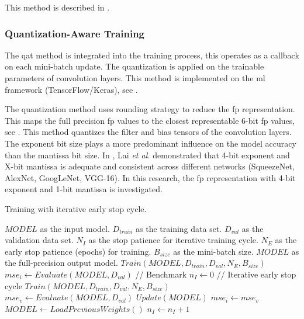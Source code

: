 This method is described in .

\subsubsection{Quantization-Aware Training}
The \gls{qat} method is integrated into the training process, this operates as a callback on each mini-batch update. The quantization is applied on the trainable parameters of convolution layers. This method is implemented on the \gls{ml} framework (TensorFlow/Keras), see .

The quantization method uses rounding strategy to reduce the \gls{fp} representation. This maps the full precision \gls{fp} values to the closest representable 6-bit \gls{fp} values, see . This method quantizes the filter and bias tensors of the convolution layers. The exponent bit size plays a more predominant influence on the model accuracy than the mantissa bit size. In \cite{lai2017deep}, Lai \textit{et al.} demonstrated that 4-bit exponent and X-bit mantissa is adequate and consistent across different networks (SqueezeNet, AlexNet, GoogLeNet, VGG-16). In this research, the \gls{fp} representation with 4-bit exponent and 1-bit mantissa is investigated.

\begin{algorithm}[h!]
	\caption{Training with iterative early stop cycle.}
	\label{alg:training}
	\begin{algorithmic}
		\SetAlgoLined
		\renewcommand{\algorithmicrequire}{\textbf{input:}}
		\renewcommand{\algorithmicensure}{\textbf{output:}}
		\REQUIRE $MODEL$ as the input model.
		\REQUIRE $D_{train}$ as the training data set.
		\REQUIRE $D_{val}$ as the validation data set.
		\REQUIRE $N_{I}$ as the stop patience for iterative training cycle.
		\REQUIRE $N_{E}$ as the early stop patience (epochs) for training.
		\REQUIRE $B_{size}$ as the mini-batch size.
		\ENSURE $MODEL$ as the full-precision output model.
		\STATE $Train(MODEL, D_{train}, D_{val}, N_{E}, B_{size})$
		\STATE $mse_i \gets Evaluate(MODEL, D_{val})$ // Benchmark
		\STATE $n_I \gets 0$
		\STATE // Iterative early stop cycle
		\STATE $Train(MODEL, D_{train}, D_{val}, N_{E}, B_{size})$
		\STATE $mse_v \gets Evaluate(MODEL, D_{val})$
			\STATE $Update(MODEL)$
			\STATE $mse_i \gets mse_v$
		\ELSE
			\STATE $MODEL  \gets LoadPreviousWeights()$
			\STATE $n_I \gets n_I + 1$
		\ENDIF
		\ENDWHILE
	\end{algorithmic}
\end{algorithm}


